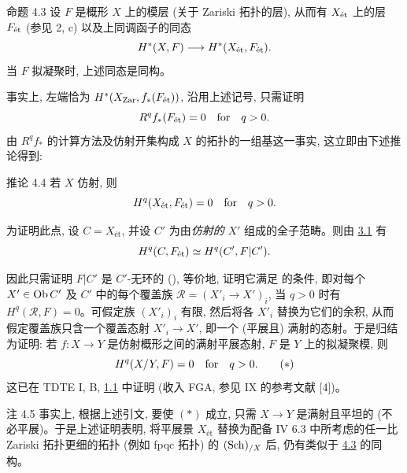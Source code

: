 \begin{enonce*}{命题 4.3}
设 $F$ 是概形 $X$ 上的模层 (关于 Zariski 拓扑的层), 从而有 $X_{\text{\rm ét}}$ 上的层 $F_{\text{\rm ét}}$ (参见 2, c) 以及上同调函子的同态
$$
H^{\ast} (X, F) \to H^{\ast} (X_{\text{\rm ét}}, F_{\text{\rm ét}}){\quoi}.
$$
当 $F$ 拟凝聚时, 上述同态是同构。
\end{enonce*}

事实上, 左端恰为 $H^{\ast}(X_{\operatorname{Zar}},f_{\ast}(F_{\text{ét}}))$, 沿用上述记号, 只需证明
$$
R^q f_{\ast} (F_{\text{ét}}) = 0\quad \mbox{for}\quad q > 0{}.
$$
由 $R^qf_{\ast}$ 的计算方法及仿射开集构成 $X$ 的拓扑的一组基这一事实, 这立即由下述推论得到:

\begin{enonce*}{推论 4.4}
若 $X$ 仿射, 则
$$
H^{q} (X_{\text{\rm ét}}, F_{\text{\rm ét}}) = 0\quad \mbox{for}\quad q > 0{}.
$$
\end{enonce*}

为证明此点, 设 $C=X_{\text{ét}}$, 并设 $C'$ 为由\emph{仿射的} $X'$ 组成的全子范畴。则由 \hyperref[VII.prop3.1]{3.1} 有
$$
H^{q} (C, F_{\text{ét}}) \simeq H^{q} (C', F | C'){}.
$$

因此\pageoriginale 只需证明 $F|C'$ 是 $C'$-无环的 (), 等价地, 证明它满足  的条件, 即对每个 $X'\in\operatorname{Ob} C'$ 及 $C'$ 中的每个覆盖族 $ℛ=(X'_i\to X')_i$, 当 $q>0$ 时有 $H^q(ℛ,F)=0$。可假定族 $(X'_i)_i$ 有限, 然后将各 $X'_i$ 替换为它们的余积, 从而假定覆盖族只含一个覆盖态射 $X'_i\to X'$, 即一个 (平展且) 满射的态射。于是归结为证明: 若 $f:X\to Y$ 是仿射概形之间的满射平展态射, $F$ 是 $Y$ 上的拟凝聚模, 则
\begin{equation*}
H^q (X /Y, F) = 0\quad \mbox{for}\quad q > 0{}.\tag{$\ast$}
\end{equation*}
这已在 TDTE I, B, \hyperref[VII.subsec1.1]{1.1} 中证明 (收入 FGA, 参见 IX 的参考文献 [4])。

\begin{enonce*}[remark]{注 4.5}
事实上, 根据上述引文, 要使 $(\ast)$ 成立, 只需 $X\to Y$ 是满射且平坦的 (不必平展)。于是上述证明表明, 将平展景 $X_{\text{ét}}$ 替换为配备  IV 6.3 中所考虑的任一比 Zariski 拓扑更细的拓扑 (例如 fpqc 拓扑) 的 $(\operatorname{Sch})_{/X}$ 后, 仍有类似于 \hyperref[VII.prop4.3]{4.3} 的同构。
\end{enonce*}


